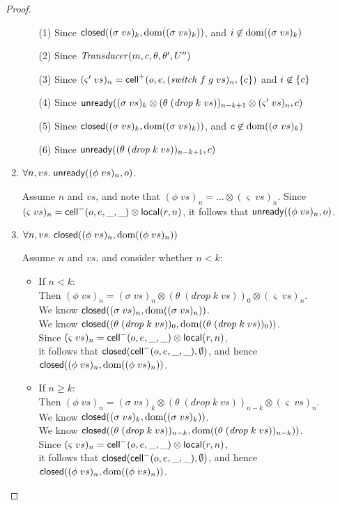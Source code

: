 \begin{proof}
\begin{enumerate}
  \begin{itemize}
  \item[(1)] Since $\mathsf{closed}({(\sigma\;vs)_k}, {\mbox{dom}({(\sigma\;vs)_k})})$, and $i \not\in \mbox{dom}({(\sigma\;vs)_k})$ 
  \item[(2)] Since $\mathit{Transducer}(m, c, \theta, \theta', U'')$ 
  \item[(3)] Since $(\varsigma'\;vs)_n = \mathsf{cell}^{+}({o}, {e}, {(\mathit{switch}\;f\;g\;vs)_n}, {\{{c}\}})$ and $i \not\in \{{c}\}$
  \item[(4)] Since $\mathsf{unready}({(\sigma\;vs)_k \otimes (\theta\;(\mathit{drop}\;k\;vs))_{n-k+1} \otimes (\varsigma'\;vs)_n}, {c})$
  \item[(5)] Since $\mathsf{closed}({(\sigma\;vs)_k}, {\mbox{dom}({(\sigma\;vs)_k})})$, and $c\not\in\mbox{dom}({(\sigma\;vs)_k})$
  \item[(6)] Since $\mathsf{unready}({(\theta\;(\mathit{drop}\;k\;vs))_{n-k+1}}, {c})$
  \end{itemize}

\item $\forall n, vs.\; \mathsf{unready}({(\phi\;vs)_n}, {o})$.

  Assume $n$ and $vs$, and note that $(\phi\;vs)_n = \ldots \otimes (\varsigma\;vs)_n$. Since 
  $(\varsigma\;vs)_n = \mathsf{cell}^{-}({o}, {e}, {\_}, {\_}) \otimes \mathsf{local}({r}, {n})$, it follows that $\mathsf{unready}({(\phi\;vs)_n}, {o})$. 

\item $\forall n, vs.\; \mathsf{closed}({(\phi\;vs)_n}, {\mbox{dom}({(\phi\;vs)_n})})$

  Assume $n$ and $vs$, and consider whether $n < k$:
  \begin{itemize}
  \item If $n < k$: \\ 
    Then $(\phi\;vs)_n = (\sigma\;vs)_{n} \otimes (\theta\;(\mathit{drop}\;k\;vs))_0 \otimes (\varsigma\;vs)_{n}$. \\
    We know $\mathsf{closed}({(\sigma\;vs)_{n}}, {\mbox{dom}({(\sigma\;vs)_{n}})})$. \\
    We know $\mathsf{closed}({(\theta\;(\mathit{drop}\;k\;vs))_0}, {\mbox{dom}({(\theta\;(\mathit{drop}\;k\;vs))_0})})$. \\
    Since $(\varsigma\;vs)_n = \mathsf{cell}^{-}({o}, {e}, {\_}, {\_}) \otimes \mathsf{local}({r}, {n})$, \\
    it follows that $\mathsf{closed}({\mathsf{cell}^{-}({o}, {e}, {\_}, {\_})}, {\emptyset})$, and hence $\mathsf{closed}({(\phi\;vs)_n}, {\mbox{dom}({(\phi\;vs)_n})})$. 
  \item If $n \geq k$: \\ 
    Then $(\phi\;vs)_n = (\sigma\;vs)_k \otimes (\theta\;(\mathit{drop}\;k\;vs))_{n-k} \otimes (\varsigma\;vs)_{n}$. \\
    We know $\mathsf{closed}({(\sigma\;vs)_{k}}, {\mbox{dom}({(\sigma\;vs)_{k}})})$. \\
    We know $\mathsf{closed}({(\theta\;(\mathit{drop}\;k\;vs))_{n-k}}, {\mbox{dom}({(\theta\;(\mathit{drop}\;k\;vs))_{n-k}})})$. \\
    Since $(\varsigma\;vs)_n = \mathsf{cell}^{-}({o}, {e}, {\_}, {\_}) \otimes \mathsf{local}({r}, {n})$, \\
    it follows that $\mathsf{closed}({\mathsf{cell}^{-}({o}, {e}, {\_}, {\_})}, {\emptyset})$, and hence
    $\mathsf{closed}({(\phi\;vs)_n}, {\mbox{dom}({(\phi\;vs)_n})})$. 
  \end{itemize}


\end{enumerate}
\end{proof}
